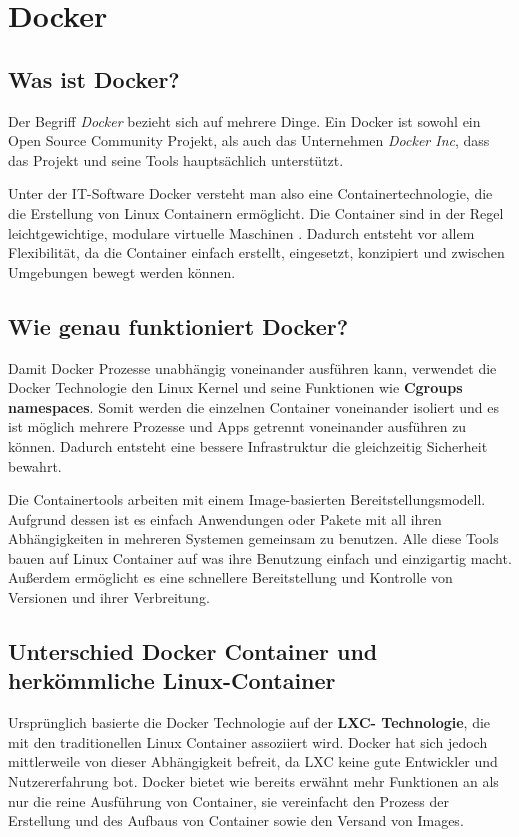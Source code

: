 \section{Docker}
\label{Docker}
\subsection{Was ist Docker?}
Der Begriff \textit{Docker} bezieht sich auf mehrere Dinge. Ein Docker ist sowohl ein Open Source
Community Projekt, als auch das Unternehmen \textit{Docker Inc}, dass das Projekt und seine Tools
hauptsächlich unterstützt.

Unter der IT-Software Docker versteht man also eine Containertechnologie, die die Erstellung von Linux
Containern ermöglicht. Die Container sind in der Regel leichtgewichtige, modulare virtuelle Maschinen
. Dadurch entsteht vor allem Flexibilität, da die Container einfach erstellt, eingesetzt, konzipiert
und zwischen Umgebungen bewegt werden können.

\subsection{Wie genau funktioniert Docker?}
Damit Docker Prozesse unabhängig voneinander ausführen kann, verwendet die Docker Technologie
den Linux Kernel und seine Funktionen wie \textbf{Cgroups} \textbf{namespaces}. Somit werden die
einzelnen Container voneinander isoliert und es ist möglich mehrere Prozesse und Apps getrennt
voneinander ausführen zu können. Dadurch entsteht eine bessere Infrastruktur die gleichzeitig
Sicherheit bewahrt.

Die Containertools arbeiten mit einem Image-basierten Bereitstellungsmodell. Aufgrund dessen ist es
einfach Anwendungen oder Pakete mit all ihren Abhängigkeiten in mehreren Systemen gemeinsam zu benutzen.
Alle diese Tools bauen auf Linux Container auf was ihre Benutzung einfach und einzigartig macht.
Außerdem ermöglicht es eine schnellere Bereitstellung und Kontrolle von Versionen und ihrer Verbreitung.

\subsection{Unterschied Docker Container und herkömmliche Linux-Container}
Ursprünglich basierte die Docker Technologie auf der \textbf{LXC- Technologie}, die mit den
traditionellen Linux Container assoziiert wird. Docker hat sich jedoch mittlerweile von dieser
Abhängigkeit befreit, da LXC keine gute Entwickler und Nutzererfahrung bot. Docker bietet wie bereits
erwähnt mehr Funktionen an als nur die reine Ausführung von Container, sie vereinfacht den Prozess der
Erstellung und des Aufbaus von Container sowie den Versand von Images.

